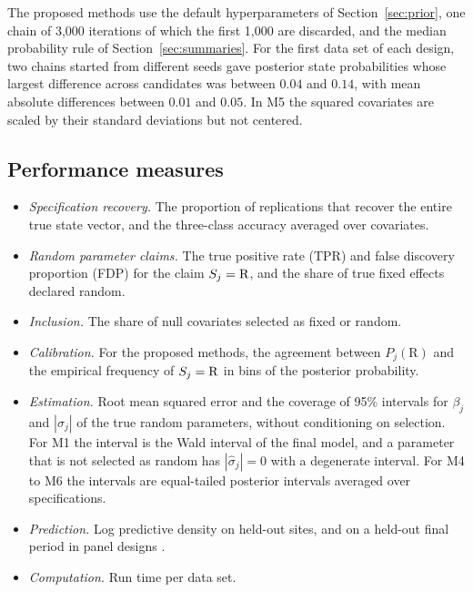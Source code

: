 The proposed methods use the default hyperparameters of Section~\ref{sec:prior}, one chain of 3{,}000 iterations of which the first 1{,}000 are discarded, and the median probability rule of Section~\ref{sec:summaries}. For the first data set of each design, two chains started from different seeds gave posterior state probabilities whose largest difference across candidates was between $0.04$ and $0.14$, with mean absolute differences between $0.01$ and $0.05$. In M5 the squared covariates are scaled by their standard deviations but not centered. 

\subsection{Performance measures}

\begin{itemize}[leftmargin=*]
\item \emph{Specification recovery.} The proportion of replications that recover the entire true state vector, and the three-class accuracy averaged over covariates.
\item \emph{Random parameter claims.} The true positive rate (TPR) and false discovery proportion (FDP) for the claim $S_j=\mathrm{R}$, and the share of true fixed effects declared random.
\item \emph{Inclusion.} The share of null covariates selected as fixed or random.
\item \emph{Calibration.} For the proposed methods, the agreement between $P_j(\mathrm{R})$ and the empirical frequency of $S_j=\mathrm{R}$ in bins of the posterior probability.
\item \emph{Estimation.} Root mean squared error and the coverage of 95\% intervals for $\beta_j$ and $|\sigma_j|$ of the true random parameters, without conditioning on selection. For M1 the interval is the Wald interval of the final model, and a parameter that is not selected as random has $|\hat\sigma_j|=0$ with a degenerate interval. For M4 to M6 the intervals are equal-tailed posterior intervals averaged over specifications.
\item \emph{Prediction.} Log predictive density on held-out sites, and on a held-out final period in panel designs \citep{vehtari2017practical}. 
\item \emph{Computation.} Run time per data set.
\end{itemize}

